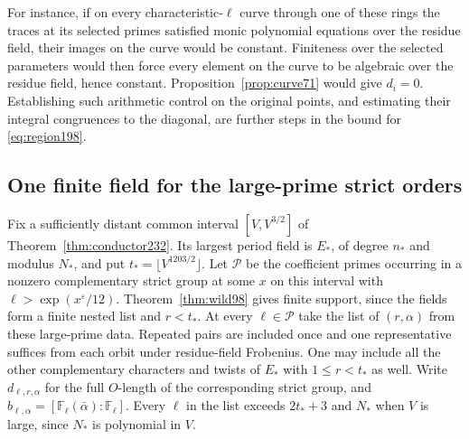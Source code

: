 \documentclass[a4paper,11pt]{article}
\theoremstyle{definition}
\theoremstyle{remark}
\numberwithin{equation}{section}
\begin{document}
For instance, if on every characteristic-\(\ell\) curve through one
of these rings the traces at its selected primes satisfied monic
polynomial equations over the residue field, their images on the
curve would be constant. Finiteness over the selected parameters
would then force every element on the curve to be algebraic over the
residue field, hence constant. Proposition~\ref{prop:curve71} would
give \(d_i=0\). Establishing such arithmetic control on the original
points, and estimating their integral congruences to the diagonal,
are further steps in the bound for \eqref{eq:region198}.

\subsection{One finite field for the large-prime strict orders}\label{nav:II-54}
Fix a sufficiently distant common interval \([V,V^{3/2}]\)
of Theorem~\ref{thm:conductor232}. Its largest period field is
\(E_*\), of degree \(n_*\) and modulus \(N_*\), and put
\(t_*=\lfloor V^{1203/2}\rfloor\). Let \(\mathcal P\) be the
coefficient primes occurring in a nonzero complementary strict
group at some \(x\) on this interval with
\(\ell>\exp(x^\varepsilon/12)\). Theorem~\ref{thm:wild98}
gives finite support, since the fields form a finite nested
list and \(r<t_*\). At every \(\ell\in\mathcal P\) take the
list of \((r,\alpha)\) from these large-prime data. Repeated
pairs are included once and one representative suffices from
each orbit under residue-field Frobenius. One may include all
the other complementary characters and twists of \(E_*\)
with \(1\le r<t_*\) as well. Write \(d_{\ell,r,\alpha}\) for
the full \(O\)-length of the corresponding strict group,
and \(b_{\ell,\alpha}=[\mathbb F_\ell(\bar\alpha):\mathbb F_\ell]\).
Every \(\ell\) in the list exceeds \(2t_*+3\) and \(N_*\)
when \(V\) is large, since \(N_*\) is polynomial in \(V\).
\end{document}
